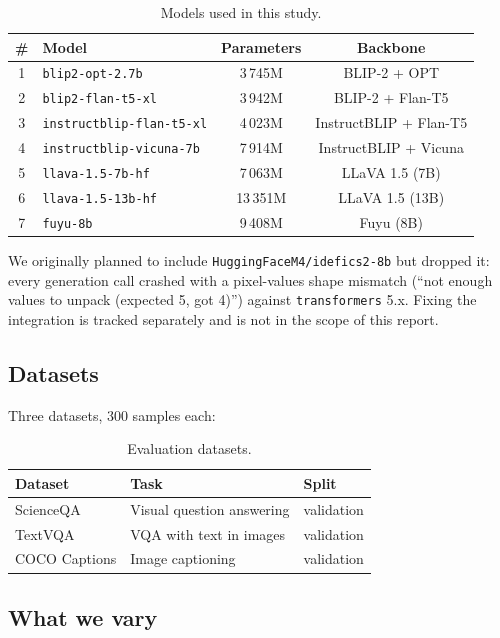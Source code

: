 \documentclass[12pt,a4paper]{article}
\begin{document}
\begin{table}[H]
\centering
\caption{Models used in this study.}
\begin{tabular}{@{}clcc@{}}
\toprule
\# & Model & Parameters & Backbone \\
\midrule
1 & \texttt{blip2-opt-2.7b} & 3\,745M & BLIP-2 + OPT \\
2 & \texttt{blip2-flan-t5-xl} & 3\,942M & BLIP-2 + Flan-T5 \\
3 & \texttt{instructblip-flan-t5-xl} & 4\,023M & InstructBLIP + Flan-T5 \\
4 & \texttt{instructblip-vicuna-7b} & 7\,914M & InstructBLIP + Vicuna \\
5 & \texttt{llava-1.5-7b-hf} & 7\,063M & LLaVA 1.5 (7B) \\
6 & \texttt{llava-1.5-13b-hf} & 13\,351M & LLaVA 1.5 (13B) \\
7 & \texttt{fuyu-8b} & 9\,408M & Fuyu (8B) \\
\bottomrule
\end{tabular}
\end{table}

We originally planned to include \texttt{HuggingFaceM4/idefics2-8b} but dropped it: every generation call crashed with a pixel-values shape mismatch (``not enough values to unpack (expected 5, got 4)'') against \texttt{transformers} 5.x. Fixing the integration is tracked separately and is not in the scope of this report.

\subsection{Datasets}

Three datasets, 300 samples each:

\begin{table}[H]
\centering
\caption{Evaluation datasets.}
\begin{tabular}{@{}lll@{}}
\toprule
Dataset & Task & Split \\
\midrule
ScienceQA & Visual question answering & validation \\
TextVQA & VQA with text in images & validation \\
COCO Captions & Image captioning & validation \\
\bottomrule
\end{tabular}
\end{table}

\subsection{What we vary}
\end{document}
